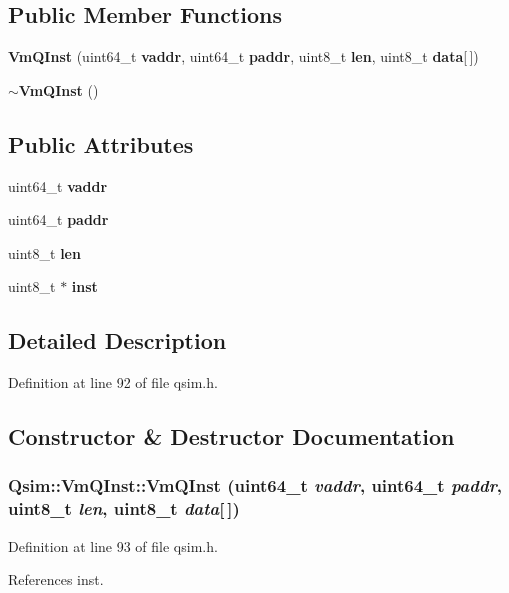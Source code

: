 \subsection*{Public Member Functions}
\begin{CompactItemize}
\item 
{\bf VmQInst} (uint64\_\-t {\bf vaddr}, uint64\_\-t {\bf paddr}, uint8\_\-t {\bf len}, uint8\_\-t {\bf data}[$\,$])
\item 
{\bf $\sim$VmQInst} ()
\end{CompactItemize}
\subsection*{Public Attributes}
\begin{CompactItemize}
\item 
uint64\_\-t {\bf vaddr}
\item 
uint64\_\-t {\bf paddr}
\item 
uint8\_\-t {\bf len}
\item 
uint8\_\-t $\ast$ {\bf inst}
\end{CompactItemize}


\subsection{Detailed Description}


Definition at line 92 of file qsim.h.

\subsection{Constructor \& Destructor Documentation}
\subsubsection[{VmQInst}]{\setlength{\rightskip}{0pt plus 5cm}Qsim::VmQInst::VmQInst (uint64\_\-t {\em vaddr}, \/  uint64\_\-t {\em paddr}, \/  uint8\_\-t {\em len}, \/  uint8\_\-t {\em data}[$\,$])\hspace{0.3cm}{\tt  [inline]}}\label{structQsim_1_1VmQInst_407b4fab9bf291628eb86f22608330b1}




Definition at line 93 of file qsim.h.

References inst.
